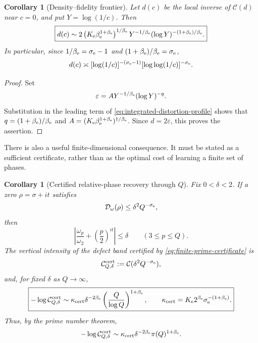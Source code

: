 \documentclass[11pt]{article}
\newtheorem{corollary}[theorem]{Corollary}
\theoremstyle{definition}
\theoremstyle{remark}
\newcommand{\eps}{\varepsilon}
\begin{document}
\begin{corollary}[Density--fidelity frontier]
\label{cor:density-fidelity-frontier}
Let $d(c)$ be the local inverse of $\mathcal C(d)$ near $c=0$, and put
$Y=\log(1/c)$.  Then
\begin{equation}
\label{eq:density-fidelity-inverse}
 \boxed{
 d(c)\sim
 2\left(K_{\rm e}\beta_{\rm e}^{1+\beta_{\rm e}}
   \right)^{1/\beta_{\rm e}}
 Y^{-1/\beta_{\rm e}}
 (\log Y)^{-(1+\beta_{\rm e})/\beta_{\rm e}}.
 }
\end{equation}
In particular, since $1/\beta_{\rm e}=\sigma_{\rm e}-1$ and
$(1+\beta_{\rm e})/\beta_{\rm e}=\sigma_{\rm e}$,
\begin{equation}
\label{eq:density-fidelity-geometric}
 d(c)\asymp
 [\log(1/c)]^{-(\sigma_{\rm e}-1)}
 [\log\log(1/c)]^{-\sigma_{\rm e}}.
\end{equation}
\end{corollary}

\begin{proof}
Set
\[
 \eps=A Y^{-1/\beta_{\rm e}}(\log Y)^{-q}.
\]
Substitution in the leading term of
\eqref{eq:integrated-distortion-profile} shows that
$q=(1+\beta_{\rm e})/\beta_{\rm e}$ and
$A=(K_{\rm e}\beta_{\rm e}^{1+\beta_{\rm e}})^{1/\beta_{\rm e}}$.
Since $d=2\eps$, this proves the assertion.
\end{proof}

There is also a useful finite-dimensional consequence.  It must be stated as
a sufficient certificate, rather than as the optimal cost of learning a
finite set of phases.

\begin{corollary}[Certified relative-phase recovery through $Q$]
\label{cor:finite-prime-certificate}
Fix $0<\delta<2$.  If a zero $\rho=\sigma+it$ satisfies
\begin{equation}
\label{eq:finite-prime-certificate}
 \mathcal D_\omega(\rho)\leq \delta^2Q^{-\sigma_{\rm e}},
\end{equation}
then
\[
 \left|\frac{\omega_p}{\omega_2}
       +\left(\frac p2\right)^{it}\right|\leq\delta
 \qquad(3\leq p\leq Q).
\]
The vertical intensity of the defect band certified by
\eqref{eq:finite-prime-certificate} is
\[
 \mathcal C_{Q,\delta}^{\rm cert}
 :=\mathcal C(\delta^2Q^{-\sigma_{\rm e}}),
\]
and, for fixed $\delta$ as $Q\to\infty$,
\begin{equation}
\label{eq:finite-prime-cost}
 \boxed{
 -\log\mathcal C_{Q,\delta}^{\rm cert}
 \sim \kappa_{\rm cert}\delta^{-2\beta_{\rm e}}
       \left(\frac Q{\log Q}\right)^{1+\beta_{\rm e}},
 \qquad
 \kappa_{\rm cert}
 =K_{\rm e}2^{\beta_{\rm e}}
  \sigma_{\rm e}^{-(1+\beta_{\rm e})}.
 }
\end{equation}
Thus, by the prime number theorem,
\begin{equation}
\label{eq:finite-prime-cost-pi}
 -\log\mathcal C_{Q,\delta}^{\rm cert}
 \sim\kappa_{\rm cert}\delta^{-2\beta_{\rm e}}
       \pi(Q)^{1+\beta_{\rm e}}.
\end{equation}
\end{corollary}
\end{document}
